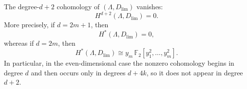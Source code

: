 \documentclass[10pt,a4paper]{amsart}
\begin{document}
\begin{claim}
\label{claim:degree_dplus2_acyclic}
The degree-$d+2$ cohomology of $(\Lambda,D_{\lim})$ vanishes:
\begin{equation}
H^{d+2}(\Lambda,D_{\lim})=0.
\end{equation}
More precisely, if $d=2m+1$, then
\begin{equation}
H^{*}(\Lambda,D_{\lim})=0,
\end{equation}
whereas if $d=2m$, then
\begin{equation}
H^{*}(\Lambda,D_{\lim})
\cong
y_m\,\mathbb F_2[y_1^2,\dots,y_m^2].
\end{equation}
In particular, in the even-dimensional case the nonzero cohomology begins in degree $d$ and then occurs only in degrees $d+4k$, so it does not appear in degree $d+2$.
\end{claim}
\end{document}
